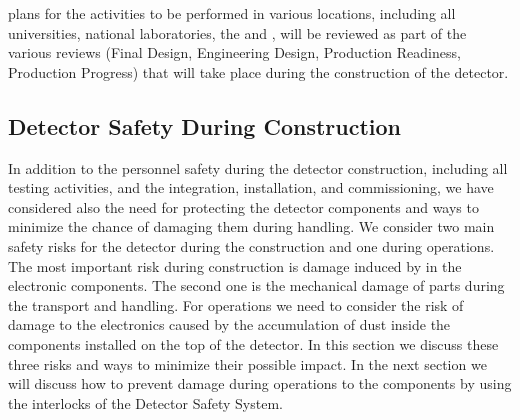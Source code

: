  plans for the activities to be performed in various
locations, including all universities, national laboratories,
the  and \surf, will be  reviewed as part of the 
various reviews (Final Design, Engineering Design, Production 
Readiness, Production Progress) that will take place during the construction of the detector.

\subsection{Detector Safety During Construction}
\label{sec:fdsp-tpcelec-safety-detcon}


In addition to the personnel safety during the detector
construction, including all testing activities, and the
integration, installation, and commissioning, we have 
considered also the need for protecting the detector
components and ways to minimize the chance of damaging
them during handling. We consider two main safety risks 
for the detector during the construction and one during
operations. The most important risk during construction is damage 
induced by  in the 
electronic components. The second one is the mechanical damage of 
parts during the transport and handling. For operations we
need to consider the risk of damage to the electronics 
caused by the accumulation of dust inside the components
installed on the top of the detector. In this section 
we discuss these three risks and ways to minimize their possible 
impact. In the next section we will discuss how to prevent
damage during operations to the  components 
by using the interlocks of the Detector Safety System.

